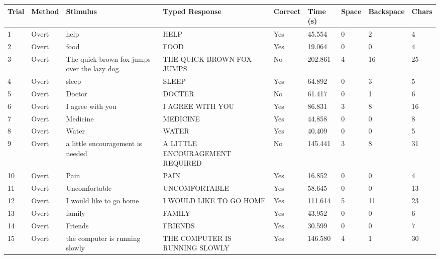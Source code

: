 \documentclass[10pt,a4paper]{article}
\begin{document}
\begin{center}
\begin{tabularx}{\textwidth}{
    C{0.45in}
    C{0.65in}
    L{2.35in}
    L{2.55in}
    C{0.65in}
    C{0.65in}
    C{0.55in}
    C{0.75in}
    C{0.55in}
}
\toprule

\textbf{Trial} &
\textbf{Method} &
\textbf{Stimulus} &
\textbf{Typed Response} &
\textbf{Correct} &
\textbf{Time (s)} &
\textbf{Space} &
\textbf{Backspace} &
\textbf{Chars}
\\

\midrule

1 &
Overt &
help &
HELP &
Yes &
45.554 &
0 &
2 &
4
\\

2 &
Overt &
food &
FOOD &
Yes &
19.064 &
0 &
0 &
4
\\

3 &
Overt &
The quick brown fox jumps over the lazy dog. &
THE QUICK BROWN FOX JUMPS &
No &
202.861 &
4 &
16 &
25
\\

4 &
Overt &
sleep &
SLEEP &
Yes &
64.892 &
0 &
3 &
5
\\

5 &
Overt &
Doctor &
DOCTER &
No &
61.417 &
0 &
1 &
6
\\

6 &
Overt &
I agree with you &
I AGREE WITH YOU &
Yes &
86.831 &
3 &
8 &
16
\\

7 &
Overt &
Medicine &
MEDICINE &
Yes &
44.858 &
0 &
0 &
8
\\

8 &
Overt &
Water &
WATER &
Yes &
40.409 &
0 &
0 &
5
\\

9 &
Overt &
a little encouragement is needed &
A LITTLE ENCOURAGEMENT REQUIRED &
No &
145.441 &
3 &
8 &
31
\\

10 &
Overt &
Pain &
PAIN &
Yes &
16.852 &
0 &
0 &
4
\\

11 &
Overt &
Uncomfortable &
UNCOMFORTABLE &
Yes &
58.645 &
0 &
0 &
13
\\

12 &
Overt &
I would like to go home &
I WOULD LIKE TO GO HOME &
Yes &
111.614 &
5 &
11 &
23
\\

13 &
Overt &
family &
FAMILY &
Yes &
43.952 &
0 &
0 &
6
\\

14 &
Overt &
Friends &
FRIENDS &
Yes &
30.599 &
0 &
0 &
7
\\

15 &
Overt &
the computer is running slowly &
THE COMPUTER IS RUNNING SLOWLY &
Yes &
146.580 &
4 &
1 &
30
\\

\bottomrule
\end{tabularx}
\end{center}
\end{document}
